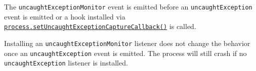 The
\texttt{\textquotesingle{}uncaughtExceptionMonitor\textquotesingle{}}
event is emitted before an
\texttt{\textquotesingle{}uncaughtException\textquotesingle{}} event is
emitted or a hook installed via
\hyperref[processsetuncaughtexceptioncapturecallbackfn]{\texttt{process.setUncaughtExceptionCaptureCallback()}}
is called.

Installing an
\texttt{\textquotesingle{}uncaughtExceptionMonitor\textquotesingle{}}
listener does not change the behavior once an
\texttt{\textquotesingle{}uncaughtException\textquotesingle{}} event is
emitted. The process will still crash if no
\texttt{\textquotesingle{}uncaughtException\textquotesingle{}} listener
is installed.

\begin{Shaded}
\begin{Highlighting}[]
   \OperatorTok{;}

\NormalTok{(}\OperatorTok{,}\OperatorTok{,}\KeywordTok{=\textgreater{}}\NormalTok{ \{}
\OperatorTok{,}\OperatorTok{;}
\NormalTok{\})}\OperatorTok{;}

\NormalTok{()}\OperatorTok{;}
\end{Highlighting}
\end{Shaded}

\begin{Shaded}
\begin{Highlighting}[]
  \OperatorTok{=} \NormalTok{(}\NormalTok{)}\OperatorTok{;}

\NormalTok{(}\OperatorTok{,}\OperatorTok{,}\KeywordTok{=\textgreater{}}\NormalTok{ \{}
\OperatorTok{,}\OperatorTok{;}
\NormalTok{\})}\OperatorTok{;}

\NormalTok{()}\OperatorTok{;}
\end{Highlighting}
\end{Shaded}

